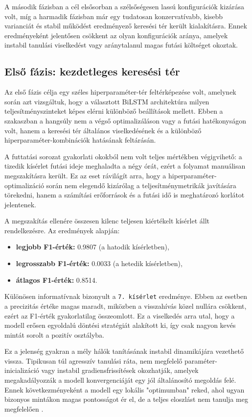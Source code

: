 A második fázisban a cél elsősorban a szélsőségesen lassú konfigurációk kizárása volt, míg a harmadik fázisban már egy tudatosan konzervatívabb, kisebb varianciát és stabil működést eredményező keresési tér került kialakításra.
Ennek eredményeként jelentősen csökkent az olyan konfigurációk aránya, amelyek instabil tanulási viselkedést vagy aránytalanul magas futási költséget okoztak.

\subsection{Első fázis: kezdetleges keresési tér}

Az első fázis célja egy széles hiperparaméter-tér feltérképezése volt, amelynek során azt vizsgáltuk, hogy a választott BiLSTM architektúra milyen teljesítményszinteket képes elérni különböző beállítások mellett. Ebben a szakaszban a hangsúly nem a végső optimalizáláson vagy a futási hatékonyságon volt, hanem a keresési tér általános viselkedésének és a különböző hiperparaméter-kombinációk hatásának feltárásán.

A futtatási sorozat gyakorlati okokból nem volt teljes mértékben végigvihető: a tizedik kísérlet futási ideje meghaladta a négy órát, ezért a folyamat manuálisan megszakításra került. Ez az eset rávilágít arra, hogy a hiperparaméter-optimalizáció során nem elegendő kizárólag a teljesítménymetrikák javítására törekedni, hanem a számítási erőforrások és a futási idő is meghatározó korlátot jelentenek.

A megszakítás ellenére összesen kilenc teljesen kiértékelt kísérlet állt rendelkezésre.
Az eredmények alapján:
\begin{itemize}
    \item \textbf{legjobb F1-érték:} 0.9807 (a hatodik kísérletben),
    \item \textbf{legrosszabb F1-érték:} 0.0033 (a hetedik kísérletben),
    \item \textbf{átlagos F1-érték:} 0.8514.
\end{itemize}

Különösen informatívnak bizonyult a \texttt{7. kísérlet} eredménye.
Ebben az esetben a precizitás értéke magas maradt, miközben a visszahívás közel nullára csökkent, ezért az F1-érték gyakorlatilag összeomlott. Ez a viselkedés arra utal, hogy a modell erősen egyoldalú döntési stratégiát alakított ki, így csak nagyon kevés mintát sorolt a pozitív osztályba.

Ez a jelenség gyakran a mély hálók tanításának instabil dinamikájára vezethető vissza. Tipikusan túl agresszív tanulási ráta, nem megfelelő paraméter-inicializáció vagy instabil gradiensfrissítések okozhatják, amelyek megakadályozzák a modell konvergenciáját egy jól általánosító megoldás felé. Ennek következményeként a modell egy lokális "optimumban" reked, ahol ugyan bizonyos mintákon magas pontosságot ér el, de a teljes eloszlást nem tanulja meg megfelelően \cite{goodfellow2016deepbook}.

